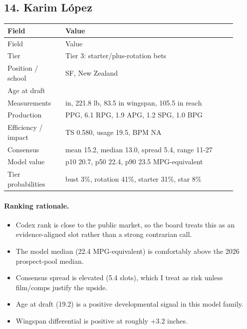\documentclass[11pt]{article}
\begin{document}
\subsection{14. Karim López}
\begin{center}
\scriptsize
\begin{longtable}{@{}>{\raggedright\arraybackslash}p{0.230\linewidth}>{\raggedright\arraybackslash}p{0.680\linewidth}@{}}
\toprule
Field & Value \\
\midrule
\endfirsthead
\toprule
Field & Value \\
\midrule
\endhead
Tier & Tier 3: starter/plus-rotation bets \\
Position / school & SF, New Zealand \\
Age at draft & 19.2 \\
Measurements & 80.2 in, 221.8 lb, 83.5 in wingspan, 105.5 in reach \\
Production & 11.9 PPG, 6.1 RPG, 1.9 APG, 1.2 SPG, 1.0 BPG \\
Efficiency / impact & TS 0.580, usage 19.5, BPM NA \\
Consensus & mean 15.2, median 13.0, spread 5.4, range 11-27 \\
Model value & p10 20.7, p50 22.4, p90 23.5 MPG-equivalent \\
Tier probabilities & bust 3\%, rotation 41\%, starter 31\%, star 8\% \\
\bottomrule
\end{longtable}
\end{center}

\paragraph{Ranking rationale.}
\begin{itemize}[leftmargin=*]
\item Codex rank is close to the public market, so the board treats this as an evidence-aligned slot rather than a strong contrarian call.
\item The model median (22.4 MPG-equivalent) is comfortably above the 2026 prospect-pool median.
\item Consensus spread is elevated (5.4 slots), which I treat as risk unless film/comps justify the upside.
\item Age at draft (19.2) is a positive developmental signal in this model family.
\item Wingspan differential is positive at roughly +3.2 inches.
\end{itemize}
\end{document}
